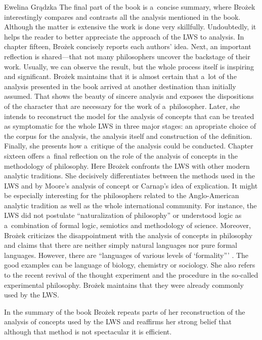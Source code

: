 \begin{newrevengenv}{Ewelina Grądzka}
The final part of the book is a~concise summary, where Brożek interestingly compares and contrasts all the analysis mentioned in the book. Although the matter is extensive the work is done very skillfully. Undoubtedly, it helps the reader to better appreciate the approach of the LWS to analysis. In chapter fifteen, Brożek concisely reports each authors' idea. Next, an important reflection is shared---that not many philosophers uncover the backstage of their work. Usually, we can observe the result, but the whole process itself is inspiring and significant. Brożek maintains that it is almost certain that a~lot of the analysis presented in the book arrived at another destination than initially assumed. That shows the beauty of sincere analysis and exposes the dispositions of the character that are necessary for the work of a~philosopher. Later, she intends to reconstruct the model for the analysis of concepts that can be treated as symptomatic for the whole LWS in three major stages: an apropriate choice of the corpus for the analysis, the analysis itself and construction of the definition. Finally, she presents how a~critique of the analysis could be conducted. Chapter sixteen offers a~final reflection on the role of the analysis of concepts in the methodology of philosophy. Here Brożek confronts the LWS with other modern analytic traditions. She decisively differentiates between the methods used in the LWS and by Moore's analysis of concept or Carnap's idea of explication. It might be especially interesting for the philosophers related to the Anglo-American analytic tradition as well as the whole international community. For instance, the LWS did not postulate ``naturalization of philosophy'' or understood logic as a~combination of formal logic, semiotics and methodology of science. Moreover, Brożek criticizes the disappointment with the analysis of concepts in philosophy and claims that there are neither simply natural languages nor pure formal languages. However, there are ``languages of various levels of ‘formality'''
\parencite[][p.220]{brozek_anti-irrationalism_2020}. %
 The good examples can be language of biology, chemistry or sociology. She also refers to the recent revival of the thought experiment and the procedure in the so-called experimental philosophy. Brożek maintains that they were already commonly used by the LWS.

In the summary of the book Brożek repeats parts of her reconstruction of the analysis of concepts used by the LWS and reaffirms her strong belief that although that method is not spectacular it is efficient.


\end{newrevengenv}
